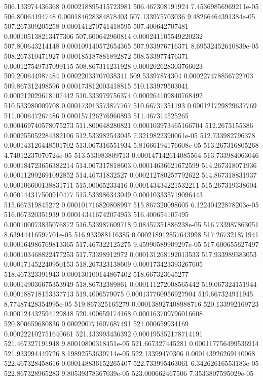 {506.133974436368 0.000218895415723981
506.467308191924 7.45369856969211e-05
506.80064194748 0.000184628384878403
507.133975703036 9.48266464391384e-05
507.267309205258 0.000141270741418595
507.400642707481 0.000105138213477306
507.600642960814 0.000241105549220232
507.800643214148 0.000109140572654365
507.933976716371 8.69532452610839e-05
508.267310471927 0.000185187881892872
508.533977476371 0.000127549737099115
508.867311231928 0.000202628303766023
509.200644987484 0.00022033707038341
509.53397874304 0.000227478856722703
509.867312498596 0.000173812003418815
510.133979503041 0.000212029618107442
510.333979756374 0.000264109840768492
510.533980009708 0.000173913573877767
510.66731351193 0.000121729829637769
511.000647267486 0.000157126276960893
511.467314525265 0.000469740578075273
511.800648280821 0.000103973465166704
512.2673155386 0.000255052284382106
512.533982543045 7.3219822390061e-05
512.733982796378 0.000143126448501702
513.067316551934 5.81666194176608e-05
513.267316805268 4.74012237070724e-05
513.533983809713 0.000147142614085564
513.733984063046 0.000184723656382214
514.067317818603 0.00014636621672599
514.267318071936 0.000112992691092852
514.46731832527 0.000212780257792622
514.867318831937 0.000106600138831711
515.00065233416 0.000143434221532211
515.267319338604 0.000144317500910477
515.533986343049 0.000103335719096443
515.667319845272 0.000101716820808997
515.867320098605 6.12240422878203e-05
516.067320351939 0.000143416742074953
516.400654107495 0.000100073835076872
516.533987609718 9.08457351886238e-05
516.733987863051 8.63944416597701e-05
516.933988116385 0.000218912857643998
517.267321871941 0.000164986769813365
517.467322125275 9.45990589909297e-05
517.600655627497 0.000103468822477253
517.73398912972 0.000131268192013533
517.933989383053 0.000171452240950153
518.267323138609 0.000173423393267605
518.467323391943 0.000130100144867402
518.667323645277 0.000149036675353949
518.86732389861 0.000111272008565442
519.067324151944 0.000188718153337713
519.4006579075 0.000137760956927904
519.667324911945 8.77487428354995e-05
519.867325165279 0.000138927408988716
520.133992169723 0.000124432594129848
520.400659174168 0.000163709796016608
520.800659680836 0.000200771607687491
521.000659934169 0.000222102751640661
521.133993436392 0.000195352178714191
521.467327191948 9.80010800318451e-05
521.667327445281 0.000117756499536914
521.933994449726 8.19892553639714e-05
522.13399470306 0.000143926269140068
522.467328458616 0.000148836152265407
522.733995463061 6.34262616553183e-05
522.867328965283 9.80539378367039e-05
523.000662467506 7.3533807595029e-05
}
